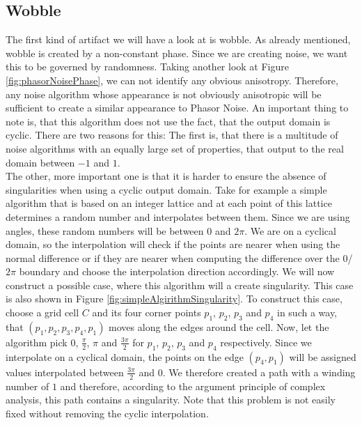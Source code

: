\documentclass{utue} %
\begin{document}
\subsection{Wobble}\label{sec:wobble}
The first kind of artifact we will have a look at is wobble. As already mentioned, wobble is created by a non-constant phase. Since we are creating noise, we want this to be governed by randomness. Taking another look at Figure \ref{fig:phasorNoisePhase}, we can not identify any obvious anisotropy. Therefore, any noise algorithm whose appearance is not obviously anisotropic will be sufficient to create a similar appearance to Phasor Noise. An important thing to note is, that this algorithm does not use the fact, that the output domain is cyclic. There are two reasons for this: The first is, that there is a multitude of noise algorithms with an equally large set of properties, that output to the real domain between $-1$ and $1$.\\
The other, more important one is that it is harder to ensure the absence of singularities when using a cyclic output domain. Take for example a simple algorithm that is based on an integer lattice and at each point of this lattice determines a random number and interpolates between them. Since we are using angles, these random numbers will be between $0$ and $2\pi$. We are on a cyclical domain, so the interpolation will check if the points are nearer when using the normal difference or if they are nearer when computing the difference over the $0$/$2\pi$ boundary and choose the interpolation direction accordingly. We will now construct a possible case, where this algorithm will a create singularity. This case is also shown in Figure \ref{fig:simpleAlgirithmSingularity}. To construct this case, choose a grid cell $C$ and its four corner points $p_1$, $p_2$, $p_3$ and $p_4$ in such a way, that $(p_1,p_2,p_3,p_4,p_1)$ moves along the edges around the cell. Now, let the algorithm pick $0$, $\frac{\pi}{2}$, $\pi$ and $\frac{3\pi}{2}$ for $p_1$, $p_2$, $p_3$ and $p_4$ respectively. Since we interpolate on a cyclical domain, the points on the edge $(p_4,p_1)$ will be assigned values interpolated between $\frac{3\pi}{2}$ and $0$. We therefore created a path with a winding number of $1$ and therefore, according to the argument principle of complex analysis, this path contains a singularity. Note that this problem is not easily fixed without removing the cyclic interpolation.
\end{document}
